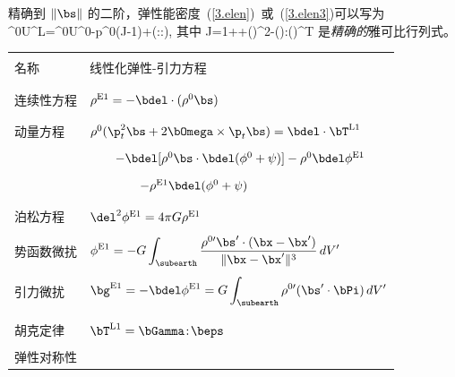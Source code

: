 {%
精确到 $\|\bs\|$ 的二阶，弹性能密度~(\ref{3.elen})~或~(\ref{3.elen3})可以写为
\eq
\label{3.hydroelen}
\rho^0U^{\rm L}=\rho^0U^0-p^0(J-1)+\half(\beps\!:\!\bGamma\!:\!\beps),
\en
其中
\eq
J=1+\bdel\cdot\bs+\half(\bdel\cdot\bs)^2-\half(\bdel\bs)\!:\!(\bdel\bs)^{\rm T}
\en
是{\em 精确的}雅可比行列式。
%
%
\begin{table}[!t]
\label{table3.3}
\centering
\begin{tabular}{|l|l|} \hline
& \\
名称 & 线性化弹性-引力方程\\
& \\ \hline
& \\
\index{continuity equation}%
连续性方程 & $\rho^{\rm E1}=-\bdel\cdot(\rho^0\bs)$ \\
& \\ \hline
& \\
\index{momentum equation}%
动量方程
& $\rho^0(\p_t^2\bs+2\bOmega\times\p_t\bs)=\bdel\cdot\bT^{\rm L1}$ \\
\vspace{-1.5 mm} & \vspace{-1.5 mm} \\
& $\qquad-\bdel[\rho^0\bs\cdot\bdel(\phi^0+\psi)]-\rho^0\bdel\phi^{\rm E1}$ \\
\vspace{-1.5 mm} & \vspace{-1.5 mm} \\
& $\qquad\qquad-\rho^{\rm E1}\bdel(\phi^0+\psi)$ \\
& \\ \hline
& \\
\index{Poisson's equation}%
泊松方程
& $\del^2\phi^{\rm E1}=4\pi G\rho^{\rm E1}$ \\
& \\
势函数微扰
& $\displaystyle{\phi^{\rm E1}=
-G\int_{\subearth}\frac{\rho^{0\prime}\bs'\cdot
(\bx-\bx')}{\|\bx-\bx'\|^3}\,dV'}$ \\
& \\
引力微扰
& $\displaystyle{\bg^{\rm E1}=-\bdel\phi^{\rm E1}=
G\int_{\subearth}\rho^{0\prime}(\bs'\cdot\bPi)\,dV'}$ \\
& \\ \hline
& \\
胡克定律
\index{Hooke's law}%
& $\bT^{\rm L1}=\bGamma\!:\!\beps$ \\
& \\
\index{tensor!elastic}%
\index{elastic tensor}%
弹性对称性

\end{tabular}
\end{table}}

